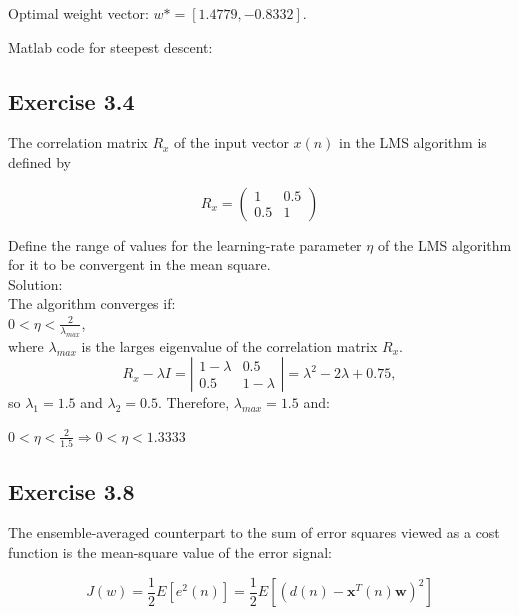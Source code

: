 \documentclass[a4paper, 12pt]{article}
\begin{document}
\smallskip

Optimal weight vector: $w* = [ 1.4779,-0.8332]$.


\newpage

Matlab code for steepest descent:
\medskip



\subsection{Exercise 3.4}
The correlation matrix $R_x$ of the input vector $x(n)$ in the LMS algorithm is defined by

\[ R_x = \left( \begin{array}{ccc}
1 & 0.5 \\
0.5  & 1 \end{array} \right)\]

Define the range of values for the learning-rate parameter $\eta$ of the LMS algorithm for it to be convergent in the mean square.\\

Solution:\\

The algorithm converges if:\\

$0 < \eta < \frac{2}{\lambda_{max}}$,\\
where $\lambda_{max}$ is the larges eigenvalue of the correlation matrix $R_x$.\\

 \[ R_x - \lambda I = \left| \begin{array}{ccc}
1 - \lambda & 0.5 \\
0.5 & 1 - \lambda \end{array} \right| = \lambda^2 - 2\lambda + 0.75,\]
so $\lambda_1 = 1.5$ and $\lambda_2 = 0.5$. Therefore, $\lambda_{max} = 1.5$ and:

$0 < \eta < \frac{2}{1.5} \Rightarrow 0 < \eta < 1.3333$

\smallskip

\subsection{Exercise 3.8}
The ensemble-averaged counterpart to the sum of error squares viewed as a cost function is the mean-square value
of the error signal:

\begin{equation*}
J(w) = \frac{1}{2}E[e^2(n)] = \frac{1}{2}E[(d(n) - \mathbf{x}^T(n)\mathbf{w})^2]
\end{equation*}
\end{document}
